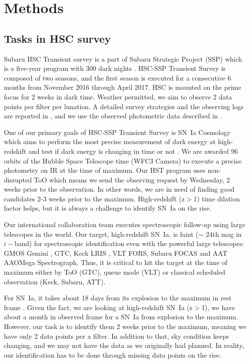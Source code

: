\documentclass[useamsfonts]{pasj01}
\begin{document}
\section{Methods}
\subsection{Tasks in HSC survey}
\label{sec:tasks}
Subaru HSC Transient survey is a part of Subaru Strategic Project (SSP) which is a five-year program with 300 dark nights \citep{aihara18a,miyazaki18a}.
HSC-SSP Transient Survey is composed of two seasons, and the first season is executed for a consecutive 6 months from November 2016 through April 2017.
HSC is mounted on the prime focus for 2 weeks in dark time.   
Weather permitted, we aim to observe 2 data points per filter per lunation.
A detailed survey strategies and the observing logs are reported in \citet{yasuda19a}, and we use the observed photometric data described in \citet{yasuda19a}.

One of our primary goals of HSC-SSP Transient Survey is SN~Ia Cosmology which aims to perform the most precise measurement of dark energy at high-redshift and test if dark energy is changing in time or not \citep{linder03b}.
We are awarded 96 orbits of the Hubble Space Telescope time (WFC3 Camera) to execute a precise photometry on IR at the time of maximum.
Our HST program uses non-disrupted ToO which means we send the observing request by Wednesday, 2 weeks prior to the observation.
In other words, we are in need of finding good candidates 2-3 weeks prior to the maximum.  High-redshift (z$>$1) time dilation factor helps, but it is always a challenge to identify SN~Ia on the rise.

Our international collaboration team executes spectroscopic follow-up using large telescopes in the world.  
Our target, high-redshift SN~Ia, is faint ($\sim$ 24th mag in $i-$band) for spectroscopic identification even with the powerful large telescopes: GMOS Gemini \citep{hook04a}, GTC, Keck LRIS \citep{oke95a}, VLT FORS, Subaru FOCAS \citep{kashikawa02a} and AAT AAOMega Spectrograph.  
Thus, it is critical to hit the target at the time of maximum either by ToO (GTC), queue mode (VLT) or classical scheduled observation (Keck, Subaru, ATT).

For SN~Ia, it takes about 18 days from its explosion to the maximum in rest frame \citep{conley06a,papadogiannakis19a}.   Given the fact, we are looking at high-redshift SN~Ia (z$>$1), we have about a month in observed frame for a SN~Ia from explosion to the maximum.   However, our task is to identify them 2 weeks prior to the maximum, meaning we have only 2 data points per a filter.   In addition to that, sky condition keeps changing, and we may not have the data as we originally had planned.   In reality, our identification has to be done through missing data points on the rise.
\end{document}
